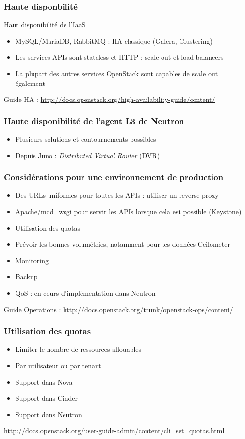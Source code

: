   \begin{frame}
    \frametitle{Haute disponbilité}
    Haut disponibilité de l'IaaS
    \begin{itemize}
      \item MySQL/MariaDB, RabbitMQ : HA classique (Galera, Clustering)
      \item Les services APIs sont stateless et HTTP : scale out et load balancers
      \item La plupart des autres services OpenStack sont capables de scale out également
    \end{itemize}
    Guide HA : \url{http://docs.openstack.org/high-availability-guide/content/}
  \end{frame}

  \begin{frame}
    \frametitle{Haute disponibilité de l'agent L3 de Neutron}
    \begin{itemize}
      \item Plusieurs solutions et contournements possibles
      \item Depuis Juno : \textit{Distributed Virtual Router} (DVR)
    \end{itemize}
  \end{frame}

  \begin{frame}
    \frametitle{Considérations pour une environnement de production}
    \begin{itemize}
      \item Des URLs uniformes pour toutes les APIs : utiliser un reverse proxy
      \item Apache/mod\_wsgi pour servir les APIs lorsque cela est possible (Keystone)
      \item Utilisation des quotas
      \item Prévoir les bonnes volumétries, notamment pour les données Ceilometer
      \item Monitoring
      \item Backup
      \item QoS : en cours d'implémentation dans Neutron
    \end{itemize}
    Guide Operations : \url{http://docs.openstack.org/trunk/openstack-ops/content/}
  \end{frame}

  \begin{frame}
    \frametitle{Utilisation des quotas}
    \begin{itemize}
      \item Limiter le nombre de ressources allouables
      \item Par utilisateur ou par tenant
      \item Support dans Nova
      \item Support dans Cinder
      \item Support dans Neutron
    \end{itemize}
    \url{http://docs.openstack.org/user-guide-admin/content/cli_set_quotas.html}
  \end{frame}

